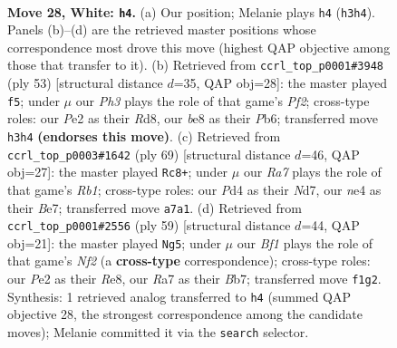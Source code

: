 \documentclass[11pt]{article}
\begin{document}
\clearpage

\begin{figure}[p]\centering
\begin{subfigure}{0.46\textwidth}\centering
\resizebox{\linewidth}{!}{%
\newchessgame
\chessboard[
  setfen={4b1k1/R4pp1/4p3/1p5p/1P1PnP2/2r3PP/1N2P3/5BK1 w - - 1 28},
  showmover=false,
  pgfstyle=straightmove, color=movearrow, markmove={h3-h4}
]}
\caption{}
\end{subfigure}\hfill
\begin{subfigure}{0.46\textwidth}\centering
\resizebox{\linewidth}{!}{%
\newchessgame
\chessboard[
  setfen={3r4/p4pk1/1p1b4/2pp3p/5P2/2P2KPP/P1P2B2/4R3 b - - 2 27},
  showmover=false,
  pgfstyle=straightmove, color=movearrow, markmove={f7-f5}
]}
\caption{}
\end{subfigure}
\\[4pt]
\begin{subfigure}{0.46\textwidth}\centering
\resizebox{\linewidth}{!}{%
\newchessgame
\chessboard[
  setfen={1r6/3nbk2/3p3p/R3p3/4Pp1P/1PK2P2/5B2/4N3 b - - 8 35},
  showmover=false,
  pgfstyle=straightmove, color=movearrow, markmove={b8-c8}
]}
\caption{}
\end{subfigure}\hfill
\begin{subfigure}{0.46\textwidth}\centering
\resizebox{\linewidth}{!}{%
\newchessgame
\chessboard[
  setfen={4r3/1bk2np1/pp3p1p/8/1PP5/2K4P/6P1/R4BB1 b - - 5 30},
  showmover=false,
  pgfstyle=straightmove, color=movearrow, markmove={f7-g5}
]}
\caption{}
\end{subfigure}
\caption{\textbf{Move 28, White: \texttt{h4}.} (a) Our position; Melanie plays \texttt{h4} (\texttt{h3h4}). Panels (b)--(d) are the retrieved master positions whose correspondence most drove this move (highest QAP objective among those that transfer to it). (b) Retrieved from \texttt{ccrl\_top\_p0001\#3948} (ply 53) [structural distance $d$=35, QAP obj=28]: the master played \texttt{f5}; under $\mu$ our \emph{Ph3} plays the role of that game's \emph{Pf2}; cross-type roles: our \emph{P}e2 as their \emph{R}d8, our \emph{b}e8 as their \emph{P}b6; transferred move \texttt{h3h4} \textbf{(endorses this move)}. (c) Retrieved from \texttt{ccrl\_top\_p0003\#1642} (ply 69) [structural distance $d$=46, QAP obj=27]: the master played \texttt{Rc8+}; under $\mu$ our \emph{Ra7} plays the role of that game's \emph{Rb1}; cross-type roles: our \emph{P}d4 as their \emph{N}d7, our \emph{n}e4 as their \emph{B}e7; transferred move \texttt{a7a1}. (d) Retrieved from \texttt{ccrl\_top\_p0001\#2556} (ply 59) [structural distance $d$=44, QAP obj=21]: the master played \texttt{Ng5}; under $\mu$ our \emph{Bf1} plays the role of that game's \emph{Nf2} (a \textbf{cross-type} correspondence); cross-type roles: our \emph{P}e2 as their \emph{R}e8, our \emph{R}a7 as their \emph{B}b7; transferred move \texttt{f1g2}. Synthesis: 1 retrieved analog transferred to \texttt{h4} (summed QAP objective 28, the strongest correspondence among the candidate moves); Melanie committed it via the \texttt{search} selector.}
\label{fig:thought-m54}
\end{figure}
\end{document}
